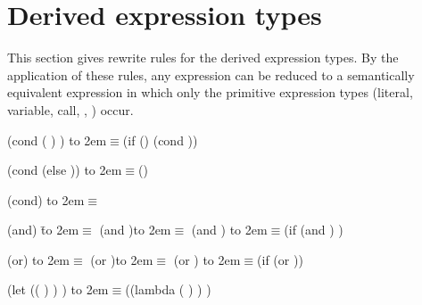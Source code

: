 \section{Derived expression types}
\label{derivedsection}

This section gives rewrite rules for the derived expression types.  By
the application of these rules, any expression can be reduced to a
semantically equivalent expression in which only the primitive
expression types (literal, variable, call, , ) occur.

\newcommand{\iet}{\hbox to 2em{\hfil $\equiv$}}  %

\begin{schemenoindent}
(cond ( )
       \dotsfoo)
\iet  (if 
          ()
          (cond  \dotsfoo))

(cond (else ))
\iet  ()

(cond)
\iet  {}
\end{schemenoindent}

\begin{schemenoindent}
(and)         \=\iet  \schtrue
(and )\>\iet  {}
(and   \dotsfoo)
\iet  (if  (and  \dotsfoo) \schfalse{})

(or)          \>\iet  \schfalse
(or )\>\iet  {}
(or   \dotsfoo)
\iet  (if   (or  \dotsfoo))

(let (( ) \dotsfoo)
  )
\iet  ((lambda ( \dotsfoo) )  \dotsfoo)
\end{schemenoindent}
